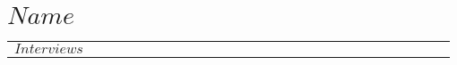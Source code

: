 \documentclass[
	openany, %
	parskip=full, %
	20pt, %
	a4paper, %
]{extbook}
\begin{document}

\section{$Name$}

\begin{longtable}[c]
{|C{0.25\linewidth}| C{0.03\linewidth}| C{0.4\linewidth}C{0.3\linewidth}|}\hline	
	$Interviews$
\end{longtable}
\end{document}
